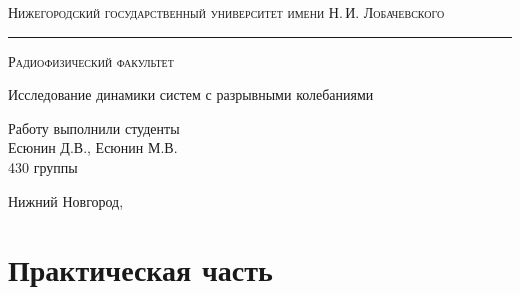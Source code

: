 \documentclass[a4paper,14pt]{extarticle}
\def\labauthors{Есюнин Д.В., Есюнин М.В.}
\def\labtheme{Исследование динамики систем с разрывными колебаниями}
\begin{document}
	\begin{titlepage}

		\begin{center}
			
			
			\textsc{Нижегородский государственный университет имени Н.\,И. Лобачевского}
			\vskip 4pt \hrule \vskip 8pt
			\textsc{Радиофизический факультет}
			
			\vfill
			
			{\Large\labtheme}
			
		\end{center}
		
		\vfill
		
		\begin{flushright}
			{Работу выполнили студенты\\ \labauthors\\ 430 группы}
		\end{flushright}
		
		\vfill
		
		\begin{center}
			Нижний Новгород, \the\year
		\end{center}
	\end{titlepage}
	\newpage 

\section*{Практическая часть}
\end{document}
